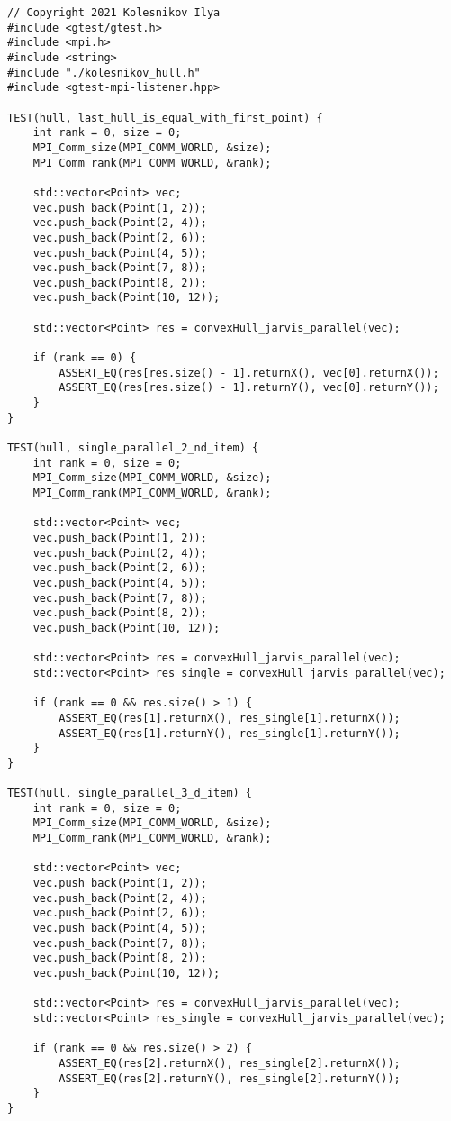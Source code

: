 \documentclass{report}
\begin{document}
\begin{lstlisting}
// Copyright 2021 Kolesnikov Ilya
#include <gtest/gtest.h>
#include <mpi.h>
#include <string>
#include "./kolesnikov_hull.h"
#include <gtest-mpi-listener.hpp>

TEST(hull, last_hull_is_equal_with_first_point) {
    int rank = 0, size = 0;
    MPI_Comm_size(MPI_COMM_WORLD, &size);
    MPI_Comm_rank(MPI_COMM_WORLD, &rank);

    std::vector<Point> vec;
    vec.push_back(Point(1, 2));
    vec.push_back(Point(2, 4));
    vec.push_back(Point(2, 6));
    vec.push_back(Point(4, 5));
    vec.push_back(Point(7, 8));
    vec.push_back(Point(8, 2));
    vec.push_back(Point(10, 12));

    std::vector<Point> res = convexHull_jarvis_parallel(vec);

    if (rank == 0) {
        ASSERT_EQ(res[res.size() - 1].returnX(), vec[0].returnX());
        ASSERT_EQ(res[res.size() - 1].returnY(), vec[0].returnY());
    }
}

TEST(hull, single_parallel_2_nd_item) {
    int rank = 0, size = 0;
    MPI_Comm_size(MPI_COMM_WORLD, &size);
    MPI_Comm_rank(MPI_COMM_WORLD, &rank);

    std::vector<Point> vec;
    vec.push_back(Point(1, 2));
    vec.push_back(Point(2, 4));
    vec.push_back(Point(2, 6));
    vec.push_back(Point(4, 5));
    vec.push_back(Point(7, 8));
    vec.push_back(Point(8, 2));
    vec.push_back(Point(10, 12));

    std::vector<Point> res = convexHull_jarvis_parallel(vec);
    std::vector<Point> res_single = convexHull_jarvis_parallel(vec);

    if (rank == 0 && res.size() > 1) {
        ASSERT_EQ(res[1].returnX(), res_single[1].returnX());
        ASSERT_EQ(res[1].returnY(), res_single[1].returnY());
    }
}

TEST(hull, single_parallel_3_d_item) {
    int rank = 0, size = 0;
    MPI_Comm_size(MPI_COMM_WORLD, &size);
    MPI_Comm_rank(MPI_COMM_WORLD, &rank);

    std::vector<Point> vec;
    vec.push_back(Point(1, 2));
    vec.push_back(Point(2, 4));
    vec.push_back(Point(2, 6));
    vec.push_back(Point(4, 5));
    vec.push_back(Point(7, 8));
    vec.push_back(Point(8, 2));
    vec.push_back(Point(10, 12));

    std::vector<Point> res = convexHull_jarvis_parallel(vec);
    std::vector<Point> res_single = convexHull_jarvis_parallel(vec);

    if (rank == 0 && res.size() > 2) {
        ASSERT_EQ(res[2].returnX(), res_single[2].returnX());
        ASSERT_EQ(res[2].returnY(), res_single[2].returnY());
    }
}


\end{lstlisting}
\end{document}

